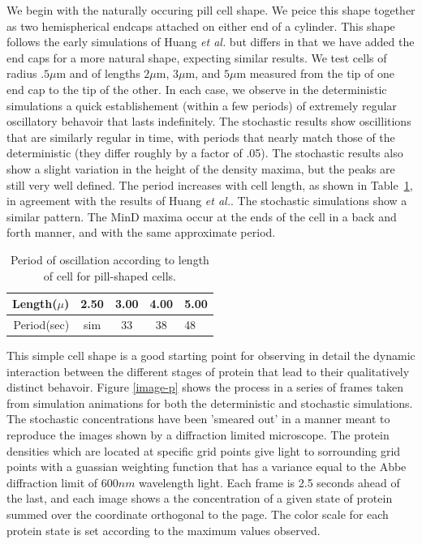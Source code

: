 \documentclass[letterpaper,twocolumn,amsmath,amssymb,pre]{revtex4-1}
\newcommand\micron{\ensuremath{\mu\text{m}}}
\begin{document}
We begin with the naturally occuring pill cell shape.  We peice this
shape together as two hemispherical endcaps attached on either end of
a cylinder.  This shape follows the early simulations of Huang
\emph{et al.} but differs in that we have added the end caps for a
more natural shape, expecting similar results.  We test cells of
radius $.5\micron$ and of lengths $2\micron$, $3\micron$, and
$5\micron$ measured from the tip of one end cap to the tip of the
other. In each case, we observe in the deterministic simulations a
quick establishement (within a few periods) of extremely regular
oscillatory behavoir that lasts indefinitely.  The stochastic results
show oscillitions that are similarly regular in time, with periods
that nearly match those of the deterministic (they differ roughly by a
factor of .05). The stochastic results also show a slight variation in
the height of the density maxima, but the peaks are still very well
defined. The period increases with cell length, as shown in
Table~\ref{tab:pill-periods}, in agreement with the results of Huang
\emph{et al.}.  The stochastic simulations show a similar pattern.
The MinD maxima occur at the ends of the cell in a back and forth
manner, and with the same approximate period.

\begin{table}
  \begin{tabular}{|r|c|c|c|l|}
    \hline
    Length($\mu$) & 2.50 & 3.00 & 4.00 & 5.00\\
    \hline
    Period(sec) & sim & 33 & 38 & 48 \\ \cline{2-2}
    \hline
  \end{tabular}
  \caption{Period of oscillation according to length of cell for
    pill-shaped cells.}\label{tab:pill-periods}
\end{table}

This simple cell shape is a good starting point for observing in
detail the dynamic interaction between the different stages of protein
that lead to their qualitatively distinct behavoir. Figure
\ref{image-p} shows the process in a series of frames taken from
simulation animations for both the deterministic and stochastic
simulations.  The stochastic concentrations have been 'smeared out' in
a manner meant to reproduce the images shown by a diffraction limited
microscope.  The protein densities which are located at specific grid
points give light to sorrounding grid points with a guassian weighting
function that has a variance equal to the Abbe diffraction limit of
$600nm$ wavelength light.  Each frame is 2.5 seconds ahead of the
last, and each image shows a the concentration of a given state of
protein summed over the coordinate orthogonal to the page.  The color
scale for each protein state is set according to the maximum values
observed.
\end{document}
